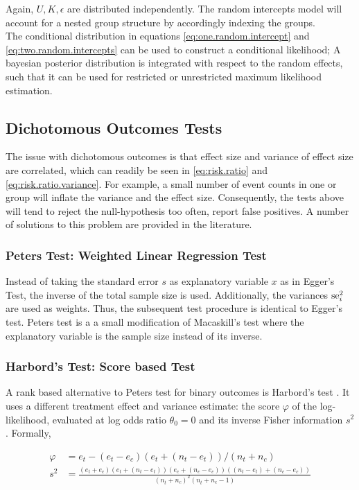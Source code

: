 \documentclass[11pt,a4paper,twoside]{book}\usepackage[]{graphicx}\usepackage[]{color}
\begin{document}
Again, $U, K, \epsilon$ are distributed independently. The random intercepts model will account for a nested group structure by accordingly indexing the groups. \\
The conditional distribution in equations \eqref{eq:one.random.intercept} and \eqref{eq:two.random.intercepts} can be used to construct a conditional likelihood; A bayesian posterior distribution is integrated with respect to the random effects, such that it can be used for restricted or unrestricted maximum likelihood estimation.


\subsection{Dichotomous Outcomes Tests}
 
The issue with dichotomous outcomes is that effect size and variance of effect size are correlated, which can readily be seen in \ref{eq:risk.ratio} and \ref{eq:risk.ratio.variance}. For example, a small number of event counts in one or group will inflate the variance and the effect size. Consequently, the tests above will tend to reject the null-hypothesis too often, \ie report false positives. A number of solutions to this problem are provided in the literature.


\subsubsection{Peters Test: Weighted Linear Regression Test} \label{sec:Peter}
Instead of taking the standard error $s$ as explanatory variable $x$ as in Egger's Test, the inverse of the total sample size is used. Additionally, the variances $\operatorname{se}_i^2$ are used as weights. Thus, the subsequent test procedure is identical to Egger's test. Peters test is a a small modification of Macaskill's test where the explanatory variable is the sample size instead of its inverse.


\subsubsection{Harbord's Test: Score based Test} \label{sec:Harbord}
A rank based alternative to Peters test for binary outcomes is Harbord's test \citep{Harbord}.
It uses a different treatment effect and variance estimate: the score $\varphi$ of the log-likelihood, evaluated at log odds ratio $\theta_0 = 0$ and its inverse Fisher information $s^2$. Formally,

\begin{align}
\varphi &= e_t - (e_t - e_c)(e_t + (n_t - e_t))/(n_t + n_c) \label{harbord.score} \\
 s^2 &= \frac{(e_t + e_c)(e_t + (n_t - e_t))(e_c + (n_c - e_c))((n_t - e_t) + (n_c - e_c))}{(n_t + n_c)^2(n_t + n_c - 1)} \label{harbord.variance}
\end{align}
\end{document}
